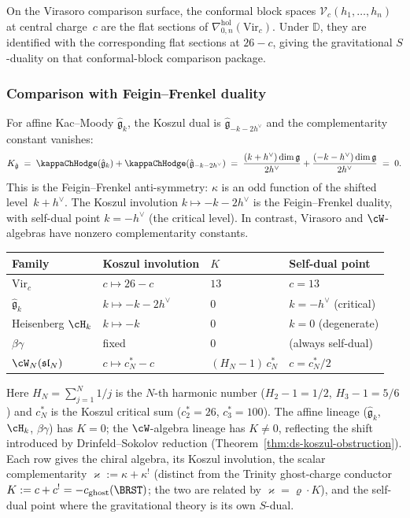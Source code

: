 On the Virasoro comparison surface, the conformal block spaces
$\mathcal{V}_c(h_1, \ldots, h_n)$ at central charge~$c$ are the flat
sections of $\nabla^{\mathrm{hol}}_{0,n}(\mathrm{Vir}_c)$. Under
$\mathbb{D}$, they are identified with the corresponding flat sections
at $26-c$, giving the gravitational $S$-duality on that conformal-block
comparison package.

\subsubsection*{Comparison with Feigin--Frenkel duality}

For affine Kac--Moody $\hat{\mathfrak{g}}_k$, the Koszul dual is
$\hat{\mathfrak{g}}_{-k-2h^\vee}$ and the complementarity constant
vanishes:
\[
K_{\hat{\mathfrak{g}}}
\;=\;
\kappaChHodge(\hat{\mathfrak{g}}_k)
+ \kappaChHodge(\hat{\mathfrak{g}}_{-k-2h^\vee})
\;=\;
\frac{(k+h^\vee)\dim\mathfrak{g}}{2h^\vee}
+ \frac{(-k-h^\vee)\dim\mathfrak{g}}{2h^\vee}
\;=\;
0.
\]
This is the Feigin--Frenkel anti-symmetry: $\kappa$ is an odd function
of the shifted level~$k + h^\vee$. The Koszul involution
$k \mapsto -k - 2h^\vee$ is the Feigin--Frenkel duality, with
self-dual point $k = -h^\vee$ (the critical level).
In contrast, Virasoro and $\cW$-algebras have nonzero complementarity
constants.

\begin{center}
\small
\renewcommand{\arraystretch}{1.15}
\begin{tabular}{llll}
\textbf{Family} & \textbf{Koszul involution}
 & $K$ & \textbf{Self-dual point} \\
\hline
$\mathrm{Vir}_c$ & $c \mapsto 26-c$ & $13$ & $c = 13$ \\[2pt]
$\hat{\mathfrak{g}}_k$ & $k \mapsto -k-2h^\vee$ &
 $0$ & $k = -h^\vee$ (critical) \\[2pt]
Heisenberg $\cH_k$ & $k \mapsto -k$ & $0$ &
 $k = 0$ (degenerate) \\[2pt]
$\beta\gamma$ & fixed & $0$ & (always self-dual) \\[2pt]
$\cW_N(\mathfrak{sl}_N)$ &
 $c \mapsto c^*_N - c$ & $(H_N{-}1)\,c^*_N$ &
 $c = c^*_N/2$
\end{tabular}
\end{center}

Here $H_N = \sum_{j=1}^N 1/j$ is the $N$-th harmonic number
($H_2 - 1 = 1/2$, $H_3 - 1 = 5/6$) and
$c^*_N$ is the Koszul critical sum
($c^*_2 = 26$, $c^*_3 = 100$).
The affine lineage ($\hat{\mathfrak{g}}_k$, $\cH_k$, $\beta\gamma$)
has $K = 0$; the $\cW$-algebra lineage has $K \neq 0$, reflecting the
shift introduced by Drinfeld--Sokolov reduction (Theorem~\ref{thm:ds-koszul-obstruction}).
Each row gives the chiral algebra, its Koszul involution, the scalar
complementarity $\varkappa := \kappa + \kappa^!$ (distinct from the Trinity
ghost-charge conductor $K := c + c^! = -c_{\mathrm{ghost}}(\BRST)$; the
two are related by $\varkappa = \varrho\cdot K$), and the self-dual
point where the gravitational theory is its own $S$-dual.

